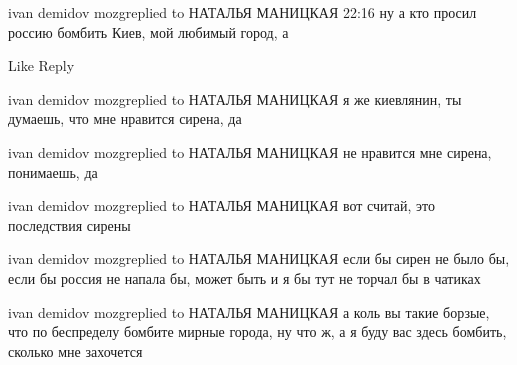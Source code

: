 




ivan demidov mozgreplied to НАТАЛЬЯ МАНИЦКАЯ
22:16
ну а кто просил россию бомбить Киев, мой любимый город, а

    Like
    Reply

ivan demidov mozgreplied to НАТАЛЬЯ МАНИЦКАЯ
я же киевлянин, ты думаешь, что мне нравится сирена, да

ivan demidov mozgreplied to НАТАЛЬЯ МАНИЦКАЯ
не нравится мне сирена, понимаешь, да

ivan demidov mozgreplied to НАТАЛЬЯ МАНИЦКАЯ
вот считай, это последствия сирены

ivan demidov mozgreplied to НАТАЛЬЯ МАНИЦКАЯ
если бы сирен не было бы, если бы россия не напала бы, может быть и я бы тут не торчал бы в чатиках

ivan demidov mozgreplied to НАТАЛЬЯ МАНИЦКАЯ
а коль вы такие борзые, что по беспределу бомбите мирные города, ну что ж, а я буду вас здесь бомбить, сколько мне захочется










